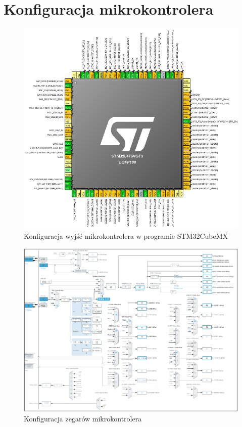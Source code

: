 \documentclass[10pt, a4paper]{article}
\begin{document}
\section{Konfiguracja mikrokontrolera}
\begin{figure}[H]
	\centering
	\includegraphics[width=1\textwidth]{figures/piny1.png}
	\caption{Konfiguracja wyjść mikrokontrolera w programie STM32CubeMX}
	\label{fig:KonfiguracjaMikrokontrolera}
\end{figure}


\begin{figure}[H]
	\centering
	\includegraphics[width=0.9\textheight,angle=90]{figures/zegar.png}
	\caption{Konfiguracja zegarów mikrokontrolera}
	\label{fig:KonfiguracjaZegara}
\end{figure}
\end{document}
